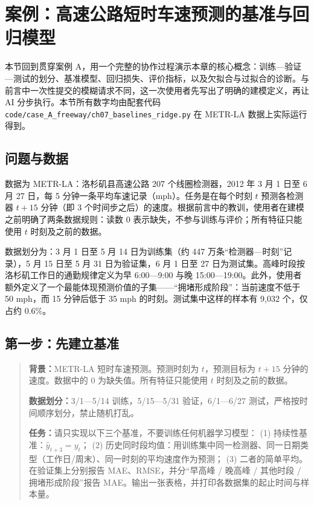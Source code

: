 \section{案例：高速公路短时车速预测的基准与回归模型}
\label{sec:ch7_case}

本节回到贯穿案例 A，用一个完整的协作过程演示本章的核心概念：训练—验证—测试的划分、基准模型、回归损失、评价指标，以及欠拟合与过拟合的诊断。与前言中一次性提交的模糊请求不同，这一次使用者先写出了明确的建模定义，再让 AI 分步执行。本节所有数字均由配套代码 \texttt{code/case\_A\_freeway/ch07\_baselines\_ridge.py} 在 METR-LA 数据上实际运行得到。

\subsection{问题与数据}

数据为 METR-LA：洛杉矶县高速公路 207 个线圈检测器，2012 年 3 月 1 日至 6 月 27 日，每 5 分钟一条平均车速记录（mph）\cite{li2018dcrnn}。任务是在每个时刻 $t$ 预测各检测器 $t+15$ 分钟（即 3 个时间步之后）的速度。根据前言中的教训，使用者在建模之前明确了两条数据规则：读数 0 表示缺失，不参与训练与评价；所有特征只能使用 $t$ 时刻及之前的数据。

数据划分为：3 月 1 日至 5 月 14 日为训练集（约 447 万条“检测器—时刻”记录），5 月 15 日至 5 月 31 日为验证集，6 月 1 日至 27 日为测试集。高峰时段按洛杉矶工作日的通勤规律定义为早 6:00—9:00 与晚 15:00—19:00。此外，使用者额外定义了一个最能体现预测价值的子集——“拥堵形成阶段”：当前速度不低于 50 mph，而 15 分钟后低于 35 mph 的时刻。测试集中这样的样本有 9,032 个，仅占约 0.6\%。

\subsection{第一步：先建立基准}

\begin{quote}
\textbf{背景：}METR-LA 短时车速预测。预测时刻为 $t$，预测目标为 $t+15$ 分钟的速度。数据中的 0 为缺失值。所有特征只能使用 $t$ 时刻及之前的数据。

\textbf{数据划分：}3/1—5/14 训练，5/15—5/31 验证，6/1—6/27 测试，严格按时间顺序划分，禁止随机打乱。

\textbf{任务：}请只实现以下三个基准，不要训练任何机器学习模型：
(1) 持续性基准：$\hat{y}_{t+3}=y_t$；
(2) 历史同时段均值：用训练集中同一检测器、同一日期类型（工作日/周末）、同一时刻的平均速度作为预测；
(3) 二者的简单平均。
在验证集上分别报告 MAE、RMSE，并分“早高峰 / 晚高峰 / 其他时段 / 拥堵形成阶段”报告 MAE。输出一张表格，并打印各数据集的起止时间与样本量。
\end{quote}

